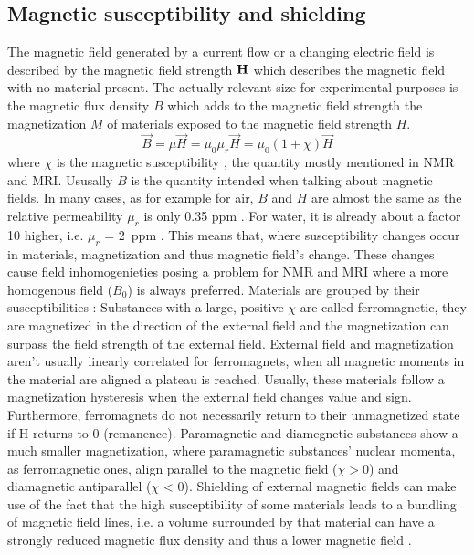             \subsection{Magnetic susceptibility and shielding}
                The magnetic field generated by a current flow or a changing electric field is described by the magnetic field strength $\mathbf{H}$ which describes the magnetic field with no material present. The actually relevant size for experimental purposes is the magnetic flux density $B$ which adds to the magnetic field strength the magnetization $M$ of materials exposed to the magnetic field strength $H$.
                \begin{equation}
                    \vec{B} = \mu \vec{H} = \mu_0 \mu_r \vec{H} = \mu_0(1+\chi) \vec{H}
                \end{equation}
                where $\chi$ is the magnetic susceptibility \cite{schenck_role_1996}, the quantity mostly mentioned in NMR and MRI. Ususally $B$ is the quantity intended when talking about magnetic fields.
                In many cases, as for example for air, $B$ and $H$ are almost the same as the relative permeability \cite{kriz_magnetic_1996} $\mu_r$ is only 0.35 ppm \cite{cullity_introduction_2008}. For water, it is already about a factor 10 higher, i.e. $\mu_r$ = 2~ppm . 
                This means that, where susceptibility changes occur in materials, magnetization and thus magnetic field's change. These changes cause field inhomogenieties posing a problem for NMR and MRI where a more homogenous field ($B_0$) is always preferred. Materials are grouped by their susceptibilities \cite{b.i._bleaney__b._bleaney_electricity_nodate}:
                Substances with a large, positive $\chi$ are called ferromagnetic, they are magnetized in the direction of the external field and the magnetization can surpass the field strength of the external field. External field and magnetization aren't usually linearly correlated for ferromagnets, when all magnetic moments in the material are aligned a plateau is reached. Usually, these materials follow a magnetization hysteresis when the external field changes value and sign. Furthermore, ferromagnets do not necessarily return to their unmagnetized state if H returns to 0 (remanence).
                Paramagnetic and diamegnetic substances show a much smaller magnetization, where paramagnetic substances' nuclear momenta, as ferromagnetic ones, align parallel to the magnetic field ($\chi>0$) and diamagnetic antiparallel ($\chi$ < 0).
                Shielding of external magnetic fields can make use of the fact that the high susceptibility of some materials leads to a bundling of magnetic field lines, i.e. a volume surrounded by that material can have a strongly reduced magnetic flux density and thus a lower magnetic field \cite{mager_magnetic_1970}.
